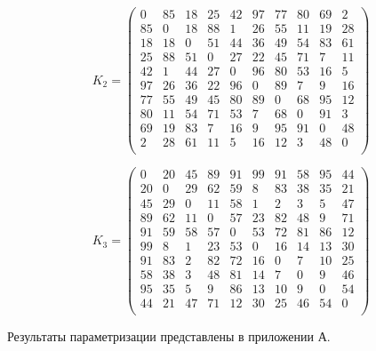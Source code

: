 \begin{equation}
	\label{eq:kd2}
	K_{2} = \begin{pmatrix}
0 & 85 & 18 & 25 & 42 & 97 & 77 & 80 & 69 & 2 \\
85 & 0 & 18 & 88 & 1 & 26 & 55 & 11 & 19 & 28 \\
18 & 18 & 0 & 51 & 44 & 36 & 49 & 54 & 83 & 61 \\
25 & 88 & 51 & 0 & 27 & 22 & 45 & 71 & 7 & 11 \\
42 & 1 & 44 & 27 & 0 & 96 & 80 & 53 & 16 & 5 \\
97 & 26 & 36 & 22 & 96 & 0 & 89 & 7 & 9 & 16 \\
77 & 55 & 49 & 45 & 80 & 89 & 0 & 68 & 95 & 12 \\
80 & 11 & 54 & 71 & 53 & 7 & 68 & 0 & 91 & 3 \\
69 & 19 & 83 & 7 & 16 & 9 & 95 & 91 & 0 & 48 \\
2 & 28 & 61 & 11 & 5 & 16 & 12 & 3 & 48 & 0	 \\
	\end{pmatrix}
\end{equation}

\begin{equation}
	\label{eq:kd3}
	K_{3} = \begin{pmatrix}
0 & 20 & 45 & 89 & 91 & 99 & 91 & 58 & 95 & 44 \\
20 & 0 & 29 & 62 & 59 & 8 & 83 & 38 & 35 & 21 \\
45 & 29 & 0 & 11 & 58 & 1 & 2 & 3 & 5 & 47 \\
89 & 62 & 11 & 0 & 57 & 23 & 82 & 48 & 9 & 71 \\
91 & 59 & 58 & 57 & 0 & 53 & 72 & 81 & 86 & 12 \\
99 & 8 & 1 & 23 & 53 & 0 & 16 & 14 & 13 & 30 \\
91 & 83 & 2 & 82 & 72 & 16 & 0 & 7 & 10 & 25 \\
58 & 38 & 3 & 48 & 81 & 14 & 7 & 0 & 9 & 46 \\
95 & 35 & 5 & 9 & 86 & 13 & 10 & 9 & 0 & 54 \\
44 & 21 & 47 & 71 & 12 & 30 & 25 & 46 & 54 & 0 \\
	\end{pmatrix}
\end{equation}

Результаты параметризации представлены в приложении А.
